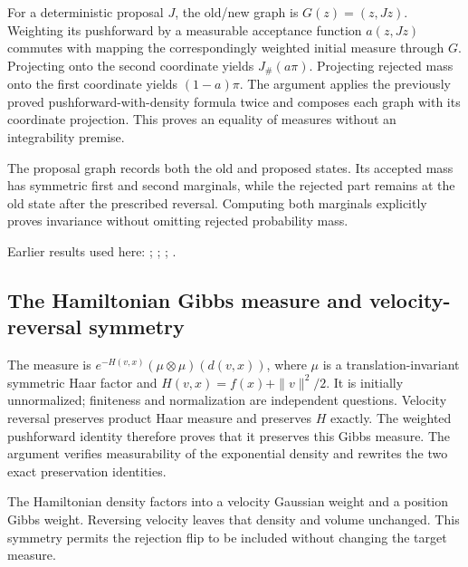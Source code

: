 \documentclass[11pt,a4paper]{report}
\begin{document}
For a deterministic proposal \(J\), the old/\allowbreak{}new graph is \(G(z)=(z,Jz)\). Weighting its pushforward by a measurable acceptance function \(a(z,Jz)\) commutes with mapping the correspondingly weighted initial measure through \(G\). Projecting onto the second coordinate yields \(J_\#(a\pi)\). Projecting rejected mass onto the first coordinate yields \((1-a)\pi\). The argument applies the previously proved pushforward-with-density formula twice and composes each graph with its coordinate projection. This proves an equality of measures without an integrability premise.



The proposal graph records both the old and proposed states. Its accepted mass has symmetric first and second marginals, while the rejected part remains at the old state after the prescribed reversal. Computing both marginals explicitly proves invariance without omitting rejected probability mass.



Earlier results used here: \cite[Section~3.35.1]{LangevinLean2026ULASC}; \cite[Section~3.35.2]{LangevinLean2026ULASC}; \cite[Section~3.35.3]{LangevinLean2026ULASC}; \cite[Section~3.35.7]{LangevinLean2026ULASC}.
\subsection{\texorpdfstring{The Hamiltonian Gibbs measure and velocity-reversal symmetry}{The Hamiltonian Gibbs measure and velocity-reversal symmetry}}
\label{report-step-KineticLangevin-HamiltonianWeak-lean-2}


The measure is \(e^{-H(v,x)}(\mu\otimes\mu)(d(v,x))\), where \(\mu\) is a translation-invariant symmetric Haar factor and \(H(v,x)=f(x)+\|v\|^2/2\). It is initially unnormalized; finiteness and normalization are independent questions. Velocity reversal preserves product Haar measure and preserves \(H\) exactly. The weighted pushforward identity therefore proves that it preserves this Gibbs measure. The argument verifies measurability of the exponential density and rewrites the two exact preservation identities.



The Hamiltonian density factors into a velocity Gaussian weight and a position Gibbs weight. Reversing velocity leaves that density and volume unchanged. This symmetry permits the rejection flip to be included without changing the target measure.
\end{document}
